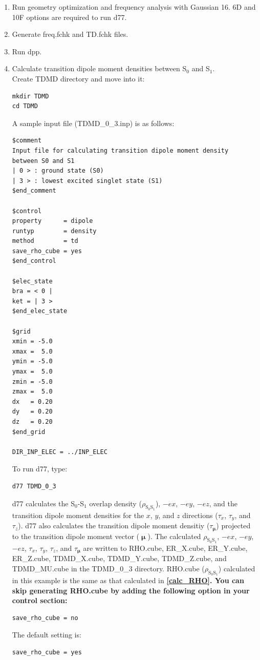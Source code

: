 ﻿\documentclass[11pt,a4paper,openany]{article}
\begin{document}
\begin{enumerate}

\item{
Run geometry optimization and frequency analysis with Gaussian 16. 
6D and 10F options are required to run d77.
}
\item{Generate freq.fchk and TD.fchk files.}
\item{Run dpp.}

\item{
Calculate transition dipole moment densities between S$_0$ and S$_1$.\\
Create TDMD directory and move into it:
\begin{verbatim}
mkdir TDMD
cd TDMD
\end{verbatim} 
A sample input file (TDMD\_0\_3.inp) is as follows:
\begin{verbatim}
$comment
Input file for calculating transition dipole moment density
between S0 and S1
| 0 > : ground state (S0)
| 3 > : lowest excited singlet state (S1)
$end_comment

$control
property      = dipole
runtyp        = density
method        = td
save_rho_cube = yes
$end_control

$elec_state
bra = < 0 |
ket = | 3 >
$end_elec_state

$grid
xmin = -5.0
xmax =  5.0
ymin = -5.0
ymax =  5.0
zmin = -5.0
zmax =  5.0
dx   = 0.20
dy   = 0.20
dz   = 0.20
$end_grid

DIR_INP_ELEC = ../INP_ELEC
\end{verbatim}
To run d77, type:
\begin{verbatim} 
d77 TDMD_0_3
\end{verbatim}
d77 calculates the S$_0$-S$_1$ overlap density ($\rho_{\mathrm{S}_0\mathrm{S}_1}$), 
$-ex$, $-ey$, $-ez$,
and the transition dipole moment densities for the $x$, $y$, and $z$ directions ($\tau_x$, $\tau_y$, and $\tau_z$).
d77 also calculates the transition dipole moment densitiy ($\tau_{\bm{\upmu}}$) projected to the transition dipole moment vector ($\bm{\upmu}$).
The calculated $\rho_{\mathrm{S}_0\mathrm{S}_1}$, $-ex$, $-ey$, $-ez$, $\tau_x$, $\tau_y$, $\tau_z$, and $\tau_{\bm{\upmu}}$
are written to RHO.cube, ER\_X.cube, ER\_Y.cube, ER\_Z.cube, 
TDMD\_X.cube, TDMD\_Y.cube, TDMD\_Z.cube, and TDMD\_MU.cube
in the TDMD\_0\_3 directory.
RHO.cube ($\rho_{\mathrm{S}_0\mathrm{S}_1}$) calculated in this example
is the same as that calculated in \bf{\ref{calc_RHO}}\rm{.}
You can skip generating RHO.cube by adding the following option in your control section:
\begin{verbatim} 
save_rho_cube = no
\end{verbatim}
The default setting is:
\begin{verbatim} 
save_rho_cube = yes
\end{verbatim}
}
\end{enumerate}
\end{document}
